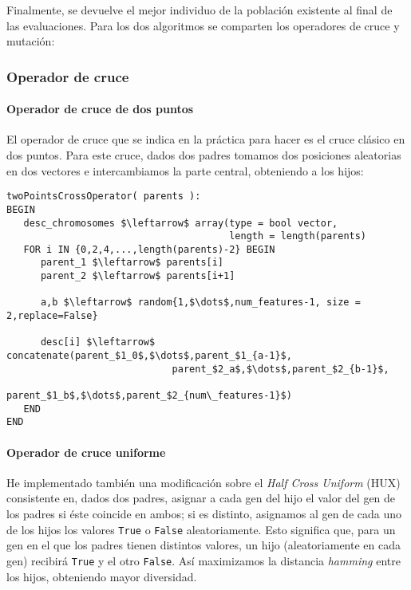 \documentclass[11pt,leqno]{article}
\begin{document}
	Finalmente, se devuelve el mejor individuo de la población existente al final de las evaluaciones. Para los dos algoritmos se comparten los operadores de cruce y mutación:
	
\subsubsection{Operador de cruce}

\paragraph{Operador de cruce de dos puntos}

	El operador de cruce que se indica en la práctica para hacer es el cruce clásico en dos puntos. Para este cruce, dados dos padres tomamos dos posiciones aleatorias en dos vectores e intercambiamos la parte central, obteniendo a los hijos:
	
\begin{lstlisting}[mathescape=true]
twoPointsCrossOperator( parents ):
BEGIN
   desc_chromosomes $\leftarrow$ array(type = bool vector,
                                       length = length(parents)
   FOR i IN {0,2,4,...,length(parents)-2} BEGIN
      parent_1 $\leftarrow$ parents[i]
      parent_2 $\leftarrow$ parents[i+1]
      
      a,b $\leftarrow$ random{1,$\dots$,num_features-1, size = 2,replace=False}
      
      desc[i] $\leftarrow$ concatenate(parent_$1_0$,$\dots$,parent_$1_{a-1}$,
                             parent_$2_a$,$\dots$,parent_$2_{b-1}$,
                             parent_$1_b$,$\dots$,parent_$2_{num\_features-1}$)
   END
END

\end{lstlisting}
	
\paragraph{Operador de cruce uniforme}

	He implementado también una modificación sobre el \textit{Half Cross Uniform} (HUX) consistente en, dados dos padres, asignar a cada gen del hijo el valor del gen de los padres si éste coincide en ambos; si es distinto, asignamos al gen de cada uno de los hijos los valores \texttt{True} o \texttt{False} aleatoriamente. Esto significa que, para un gen en el que los padres tienen distintos valores, un hijo (aleatoriamente en cada gen) recibirá \texttt{True} y el otro \texttt{False}. Así maximizamos la distancia \textit{hamming} entre los hijos, obteniendo mayor diversidad. 
	
\end{document}
